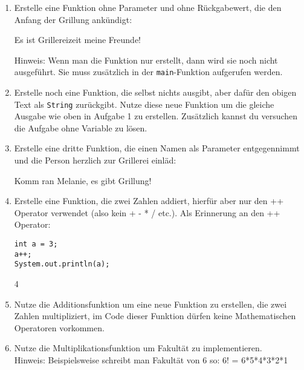 \documentclass{../../sheet}
\begin{document}
\begin{enumerate}
    \item Erstelle eine Funktion ohne Parameter und ohne Rückgabewert, die den Anfang der Grillung ankündigt:
          \begin{ausgabe}
              Es ist Grillereizeit meine Freunde!
          \end{ausgabe}
          Hinweis: Wenn man die Funktion nur erstellt, dann wird sie noch nicht ausgeführt. Sie muss zusätzlich in der \texttt{main}-Funktion aufgerufen werden.
    \item Erstelle noch eine Funktion, die selbst nichts ausgibt, aber dafür den obigen Text als \texttt{String} zurückgibt. Nutze diese neue Funktion um die gleiche Ausgabe wie oben in Aufgabe 1 zu erstellen. Zusätzlich kannst du versuchen die Aufgabe ohne Variable zu lösen.
    \item Erstelle eine dritte Funktion, die einen Namen als Parameter entgegennimmt und die Person herzlich zur Grillerei einläd:
          \begin{ausgabe}
              Komm ran Melanie, es gibt Grillung!
          \end{ausgabe}
    \item Erstelle eine Funktion, die zwei Zahlen addiert, hierfür aber nur den ++ Operator verwendet (also kein + - * / etc.). Als Erinnerung an den ++ Operator:
          \begin{verbatim}
int a = 3;
a++;
System.out.println(a);
    \end{verbatim}
          \begin{ausgabe}
              4
          \end{ausgabe}
    \item Nutze die Additionsfunktion um eine neue Funktion zu erstellen, die zwei Zahlen multipliziert, im Code dieser Funktion dürfen keine Mathematischen Operatoren vorkommen.
    \item Nutze die Multiplikationsfunktion um Fakultät zu implementieren.\\
          Hinweis: Beispielsweise schreibt man Fakultät von 6 so: 6! = 6*5*4*3*2*1
\end{enumerate}

\newpage
{}
\end{document}
